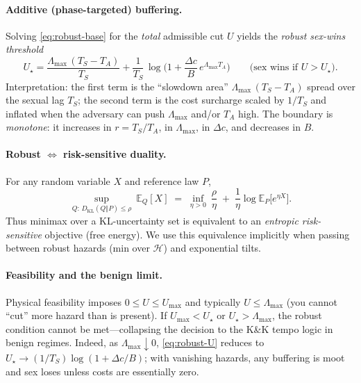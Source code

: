 \documentclass[11pt]{article}
\theoremstyle{upright}
\newcommand{\E}{\mathbb{E}}
\newcommand{\horizon}{\Lambda}
\newcommand{\Lmax}{\horizon^{(T)}_{\max}}
\newcommand{\Hset}{\mathcal{H}}
\renewcommand{\Lmax}{\Lambda_{\max}}
\begin{document}
\paragraph{Additive (phase-targeted) buffering.}
Solving \eqref{eq:robust-base} for the \emph{total} admissible cut $U$ yields the \emph{robust sex-wins threshold}
\begin{equation}
\label{eq:robust-U}
\boxed{
U_\star = \frac{\Lmax\,(T_S-T_A)}{T_S}
+ \frac{1}{T_S}\,\log\!\Big(1+\frac{\Delta c}{B}\,e^{\Lmax T_A}\Big)
}\qquad\text{(sex wins if $U>U_\star$).}
\end{equation}
Interpretation: the first term is the “slowdown area” $\Lmax\,(T_S-T_A)$ spread over the sexual lag $T_S$; the second term is the cost surcharge scaled by $1/T_S$ and inflated when the adversary can push $\Lmax$ and/or $T_A$ high. The boundary is \emph{monotone}: it increases in $r=T_S/T_A$, in $\Lmax$, in $\Delta c$, and decreases in $B$.

\paragraph{Robust $\Leftrightarrow$ risk-sensitive duality.}
For any random variable $X$ and reference law $P$,
\begin{equation}\label{eq:entropic-dual}
\sup_{Q:\,D_{\mathrm{KL}}(Q\Vert P)\le \rho}\ \E_Q[X]
\;=\;
\inf_{\eta>0}\ \frac{\rho}{\eta}\;+\;\frac{1}{\eta}\log \E_P\!\big[e^{\eta X}\big].
\end{equation}
Thus minimax over a KL-uncertainty set is equivalent to an \emph{entropic risk-sensitive} objective (free energy).
We use this equivalence implicitly when passing between robust hazards (min over $\Hset$) and exponential tilts.

\paragraph{Feasibility and the benign limit.}
Physical feasibility imposes $0\le U\le U_{\max}$ and typically $U\le \Lmax$ (you cannot “cut” more hazard than is present). If $U_{\max}<U_\star$ or $U_\star>\Lmax$, the robust condition cannot be met—collapsing the decision to the K\&K tempo logic in benign regimes. Indeed, as $\Lmax\downarrow 0$, \eqref{eq:robust-U} reduces to $U_\star\to (1/T_S)\log(1+\Delta c/B)$; with vanishing hazards, any buffering is moot and sex loses unless costs are essentially zero.
\end{document}

